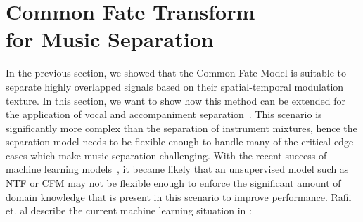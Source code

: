 \section[Common Fate Transform for Music Separation]{Common Fate Transform\\for Music Separation}%
\label{sec:cft_for_lead_accompaniment_separation}

In the previous section, we showed that the Common Fate Model is suitable to separate highly overlapped signals based on their spatial-temporal modulation texture.
In this section, we want to show how this method can be extended for the application of vocal and accompaniment separation~\cite{rafii}.
This scenario is significantly more complex than the separation of instrument mixtures, hence the separation model needs to be flexible enough to handle many of the critical edge cases which make music separation challenging.
With the recent success of machine learning models~\cite{HintonSpeech}, it became likely that an unsupervised model such as \acs{NTF} or CFM may not be flexible enough to enforce the significant amount of domain knowledge that is present in this scenario to improve performance.
Rafii et. al describe the current machine learning situation in \cite{rafii}:

